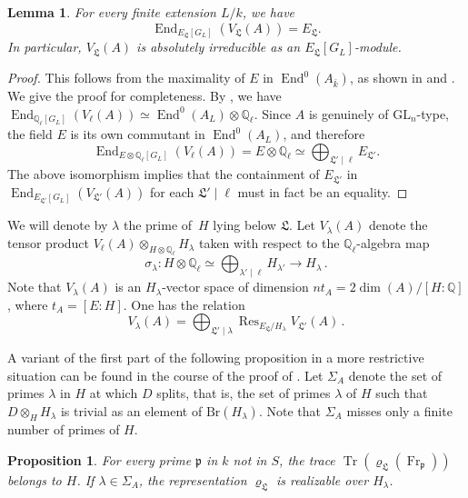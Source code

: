 \documentclass[oneside]{amsart}
\newtheorem{proposition}[theorem]{Proposition}
\newtheorem{lemma}[theorem]{Lemma}
\theoremstyle{remark}
\newcommand{\Q}{\mathbb Q}
\newcommand{\kbar}{{\bar{k}}}
\newcommand{\GL}{\mathrm{GL}}
\newcommand{\End}{\operatorname{End}}
\newcommand{\Frob}{\operatorname{Fr}}
\newcommand{\Br}{\mathrm{Br}}
\newcommand{\p}{\mathfrak{p}}
\newcommand{\Res}{\operatorname{Res}}
\newcommand{\Tr}{\operatorname{Tr}}
\newcommand{\Ll}{\mathfrak{L}}
\numberwithin{equation}{section}
\newcommand{\QQ}{\mathbb{Q}}
\begin{document}
\begin{lemma}\label{lemma:VLambda irrep}
	For every finite extension $L/k$, we have 
\[
	\End_{E_\Ll[G_L]}(V_\Ll(A))=E_\Ll.
\]
In particular, $V_\Ll(A)$ is absolutely irreducible as an $E_\Ll[G_L]$-module.
\end{lemma} 
\begin{proof}
	This follows from the maximality of $E$ in $\End^0(A_\kbar)$, as shown in \cite[p. 628]{Chi87} and \cite[\S0.11.1]{Zar89}. We give the proof for completeness.
	By \cite[Satz 4]{Fal83}, we have $\End_{\QQ_\ell[G_L]}(V_\ell(A)) \simeq \End^0(A_L)\otimes \QQ_\ell$. Since $A$ is genuinely of $\GL_n$-type, the field $E$ is its own commutant in $\End^0(A_L)$, and therefore 
	\[
	\End_{E\otimes\QQ_\ell[G_L]}(V_\ell(A)) = E\otimes\QQ_\ell \simeq \bigoplus_{\Ll'\mid \ell}E_{\Ll'}.
	\]
	The above isomorphism implies that the containment of $E_{\Ll'}$ in $\End_{E_{\Ll'}[G_L]}(V_{\Ll'}(A))$ for each $\Ll'\mid\ell$ must in fact be an equality.
\end{proof}

We will denote by $\lambda$ the prime of~$H$ lying below $\Ll$. Let $V_\lambda(A)$ denote the tensor product $V_\ell(A) \otimes_{H\otimes \Q_\ell} H_\lambda$ taken with respect to the $\Q_\ell$-algebra map
$$
\sigma_\lambda\colon H \otimes \Q_\ell\simeq \bigoplus_{\lambda' \mid \ell} H_{\lambda'} \rightarrow H_\lambda\,. 
$$
Note that $V_\lambda(A)$ is an $H_\lambda$-vector space of dimension $nt_A=2\dim(A)/[H:\Q]$, where $t_A=[E:H]$. One has the relation
\begin{equation}\label{equation: relVlVL}
V_\lambda(A)= \bigoplus_{\Ll'\mid \lambda } \Res_{E_{\Ll}/H_\lambda}V_{\Ll'}(A)\,. 
\end{equation}

A variant of the first part of the following proposition in a more restrictive situation can be found in the course of the proof of \cite[Thm. 5.3]{Rib92}.  Let $\Sigma_A$ denote the set of primes $\lambda$ in $H$ at which $D$ splits, that is, the set of primes $\lambda$ of $H$ such that $D\otimes_H H_\lambda$ is trivial as an element of $\Br(H_\lambda)$. Note that $\Sigma_A$ misses only a finite number of primes of $H$.

\begin{proposition}\label{proposition: RibetCenter}
For every prime $\p$ in $k$ not in $S$, the trace $\Tr(\varrho_\Ll(\Frob_\p))$ belongs to $H$. If $\lambda\in \Sigma_A$, the representation $\varrho_{\Ll}$ is realizable over $H_\lambda$.
\end{proposition}
\end{document}
